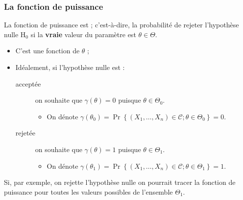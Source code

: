 \documentclass[10pt, french]{article}
\begin{document}
\begin{multicols*}{2}
\subsubsection{La fonction de puissance}

La fonction de puissance est  ; c'est-à-dire, la probabilité de rejeter l'hypothèse nulle $\mathrm{H}_{0}$ si la \textbf{vraie} valeur du paramètre est $\theta \in \Theta$. 
\begin{itemize}
	\item	C'est une fonction de $\theta$ ;
	\item	Idéalement, si l'hypothèse nulle est :
		\begin{description}
		\item[acceptée]	on souhaite que $\gamma(\theta)	=	0$ puisque $\theta \in \Theta_{0}$.
			\begin{itemize}
			\item	On dénote $\gamma(\theta_{0})	=	\Pr\left\{(X_{1}, \dots, X_{n}) \in \mathcal{C} ;  \theta \in \Theta_{0}\right\}	=	0$.
			\end{itemize}
		\item[rejetée]	on souhaite que $\gamma(\theta)	=	1$ puisque $\theta \in \Theta_{1}$.
			\begin{itemize}
			\item	On dénote $\gamma(\theta_{1})	=	\Pr\left\{(X_{1}, \dots, X_{n}) \in \mathcal{C} ; \theta \in \Theta_{1}\right\}	=	1$.
			\end{itemize}
		\end{description}
\end{itemize}

Si, par exemple, on rejette l'hypothèse nulle on pourrait tracer la fonction de puissance pour toutes les valeurs possibles de l'ensemble $\Theta_{1}$.




\columnbreak


\end{multicols*}
\end{document}
